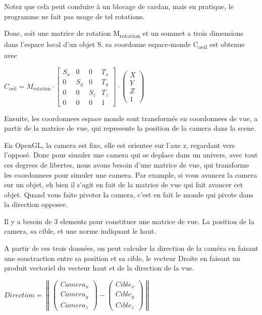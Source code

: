 \documentclass[pdftex, 11pt, a4paper, titlepage]{article}
\begin{document}
Notez que cela peut conduire à un blocage de cardan, mais en pratique,
le programme ne fait pas usage de tel rotations.

Donc, soit une matrice de rotation M\textsubscript{rotation} et un
sommet a trois dimensions dans l'espace local d'un objet S, sa
coordonne espace-monde C\textsubscript{oeil} est obtenue avec

\begin{math}
  C_\text{oeil} = M_\text{rotation} \cdot
  \begin{bmatrix}
    S_x & 0   & 0   & T_x \\
    0   & S_y & 0   & T_y \\
    0   & 0   & S_z & T_z \\
    0 & 0 & 0 & 1
  \end{bmatrix}
  \cdot
  \begin{pmatrix}
    X \\
    Y \\
    Z \\
    1
  \end{pmatrix}
\end{math}

Ensuite, les coordonnees espace monde sont transformés en coordonnees
de vue, a partir de la matrice de vue, qui represente la position de
la camera dans la scene.

En OpenGL, la camera est fixe, elle est orientee sur l'axe z,
regardant vers l'opposé. Donc pour simuler une camera qui se deplace
dans un univers, avec tout ces degrees de libertes, nous avons besoin
d'une matrice de vue, qui transforme les coordonnees pour simuler une
camera.  Par example, si vous avancez la camera sur un objet, eh bien
il s'agit en fait de la matrice de vue qui fait avancer cet objet.
Quand vous faite pivoter la camera, c'est en fait le monde qui pivote
dans la direction opposee.

Il y a besoin de 3 elements pour constituer une matrice de vue.  La
position de la camera, sa cible, et une norme indiquant le haut.

A partir de ces trois données, on peut calculer la direction de la
caméra en faisant une soustraction entre sa position et sa cible, le
vecteur Droite en faisant un produit vectoriel du vecteur haut et de
la direction de la vue.

\begin{math}
  Direction = \left\|
    \begin{pmatrix}
      Camera_x \\
      Camera_y \\
      Camera_z
    \end{pmatrix}
    -
    \begin{pmatrix}
      Cible_x \\
      Cible_y \\
      Cible_z
    \end{pmatrix}
  \right\|
\end{math}
\end{document}
